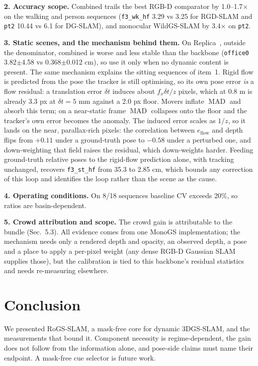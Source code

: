 \textbf{2. Accuracy scope.} Combined trails the best RGB-D comparator by 1.0--1.7$\times$ on the walking and person sequences (\texttt{f3\_wk\_hf} 3.29 vs 3.25 for RGD-SLAM and \texttt{pt2} 10.44 vs 6.1 for DG-SLAM), and monocular WildGS-SLAM by 3.4$\times$ on \texttt{pt2}.


\textbf{3. Static scenes, and the mechanism behind them.} On Replica~\cite{replica}, outside the denominator, combined is worse and less stable than the backbone (\texttt{office0} 3.82$\pm$4.58 vs 0.368$\pm$0.012 cm), so use it only when no dynamic content is present. The same mechanism explains the sitting sequences of item~1. Rigid flow is predicted from the pose the tracker is still optimising, so its own pose error \emph{is} a flow residual: a translation error $\delta t$ induces about $f_x\delta t/z$ pixels, which at 0.8 m is already 3.3 px at $\delta t = 5$ mm against a 2.0 px floor. Movers inflate $\operatorname{MAD}$ and absorb this term; on a near-static frame $\operatorname{MAD}$ collapses onto the floor and the tracker's own error becomes the anomaly. The induced error scales as $1/z$, so it lands on the near, parallax-rich pixels: the correlation between $e_{\text{flow}}$ and depth flips from $+0.11$ under a ground-truth pose to $-0.58$ under a perturbed one, and down-weighting that field raises the residual, which down-weights harder. Feeding ground-truth relative poses to the rigid-flow prediction alone, with tracking unchanged, recovers \texttt{f3\_st\_hf} from 35.3 to 2.85 cm, which bounds any correction of this loop and identifies the loop rather than the scene as the cause.


\textbf{4. Operating conditions.} On 8/18 sequences baseline CV exceeds 20\%, so ratios are basin-dependent.


\textbf{5. Crowd attribution and scope.} The crowd gain is attributable to the bundle (Sec.~5.3). All evidence comes from one MonoGS implementation; the mechanism needs only a rendered depth and opacity, an observed depth, a pose and a place to apply a per-pixel weight (any dense RGB-D Gaussian SLAM supplies those), but the calibration is tied to this backbone's residual statistics and needs re-measuring elsewhere.




\section{Conclusion}
\enlargethispage{3\baselineskip}


We presented RoGS-SLAM, a mask-free core for dynamic 3DGS-SLAM, and the measurements that bound it. Component necessity is regime-dependent, the gain does not follow from the information alone, and pose-side claims must name their endpoint. A mask-free cue selector is future work.



